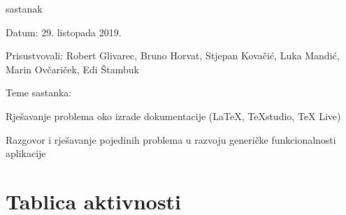 \begin{packed_enum}
		\item  sastanak
		\item[] \begin{packed_item}
			\item Datum: 29. listopada 2019.
			\item Prisustvovali: Robert Glivarec, Bruno Horvat, Stjepan Kovačić, Luka Mandić, Marin Ovčariček, Edi Štambuk
			\item Teme sastanka:
			\begin{packed_item}
				\item Rješavanje problema oko izrade dokumentacije (LaTeX, TeXstudio, TeX Live) 
				\item Razgovor i rješavanje pojedinih problema u razvoju generičke funkcionalnosti aplikacije
			\end{packed_item}
		\end{packed_item}
			
			
		\end{packed_enum}
		
		\eject
		\section*{Tablica aktivnosti}
		
					
						
